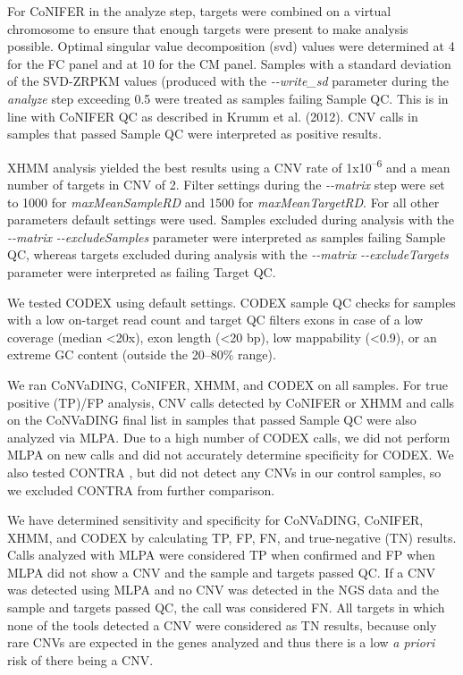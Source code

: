 For CoNIFER in the analyze step, targets were combined on a virtual chromosome to ensure that enough targets were present to make analysis possible. Optimal singular value decomposition (svd) values were determined at 4 for the FC panel and at 10 for the CM panel. 
Samples with a standard deviation of the SVD-ZRPKM values (produced with the \textsl{{-}{-}write\_sd} parameter during the \textsl{analyze} step \cite{Krumm_2012b} exceeding 0.5 were treated as samples failing Sample QC.
This is in line with CoNIFER QC as described in Krumm et al. (2012)\cite{Krumm_2012}. 
CNV calls in samples that passed Sample QC were interpreted as positive results. 

XHMM analysis yielded the best results using a CNV rate of 1x10\textsuperscript{–6} and a mean number of targets in CNV of 2. 
Filter settings during the \textsl{{-}{-}matrix} step \cite{Fromer_2012b} were set to 1000 for \textsl{maxMeanSampleRD} and 1500 for \textsl{maxMeanTargetRD}. 
For all other parameters default settings were used. 
Samples excluded during analysis with the \textsl{{-}{-}matrix} \textsl{{-}{-}excludeSamples} parameter \cite{Fromer_2012b} were interpreted as samples failing Sample QC, whereas targets excluded during analysis with the \textsl{{-}{-}matrix} \textsl{{-}{-}excludeTargets} parameter \cite{Fromer_2012b} were interpreted as failing Target QC. 

We tested CODEX using default settings. 
CODEX sample QC checks for samples with a low on-target read count and target QC filters exons in case of a low coverage (median \textless20x), exon length (\textless20 bp), low mappability (\textless0.9), or an extreme GC content (outside the 20–80\% range). 

We ran CoNVaDING, CoNIFER, XHMM, and CODEX on all samples. For true positive (TP)/FP analysis, CNV calls detected by CoNIFER or XHMM and calls on the CoNVaDING final list in samples that passed Sample QC were also analyzed via MLPA. 
Due to a high number of CODEX calls, we did not perform MLPA on new calls and did not accurately determine specificity for CODEX. 
We also tested CONTRA \cite{Li_2012}, but did not detect any CNVs in our control samples, so we excluded CONTRA from further comparison. 

We have determined sensitivity and specificity for CoNVaDING, CoNIFER, XHMM, and CODEX by calculating TP, FP, FN, and true-negative (TN) results. 
Calls analyzed with MLPA were considered TP when confirmed and FP when MLPA did not show a CNV and the sample and targets passed QC. 
If a CNV was detected using MLPA and no CNV was detected in the NGS data and the sample and targets passed QC, the call was considered FN. 
All targets in which none of the tools detected a CNV were considered as TN results, because only rare CNVs are expected in the genes analyzed and thus there is a low \textsl{a priori} risk of there being a CNV.

